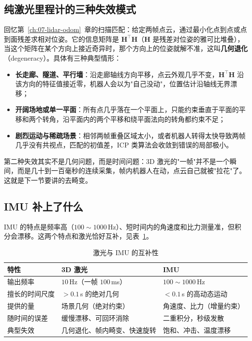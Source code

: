 \subsection{纯激光里程计的三种失效模式}

回忆第~\ref{ch:07-lidar-odom}~章的扫描匹配：给定两帧点云，通过最小化点到点或点到面残差求相对位姿。它的信息矩阵是 $\bm{H}^{\top}\bm{H}$（$\bm{H}$ 是残差对位姿的雅可比堆叠），当这个矩阵在某个方向上接近奇异时，那个方向上的位姿就解不准，这叫\textbf{几何退化}（degeneracy）。具体有三种典型情形：

\begin{itemize}
  \item \textbf{长走廊、隧道、平行墙}：沿走廊轴线方向平移，点云外观几乎不变，$\bm{H}^{\top}\bm{H}$ 沿该方向的特征值接近零，机器人会以为"自己没动"，位置估计沿轴线无界漂移；
  \item \textbf{开阔场地或单一平面}：所有点几乎落在一个平面上，只能约束垂直于平面的平移和两个转角，沿平面内的两个平移和绕平面法向的转角都约束不足；
  \item \textbf{剧烈运动与稀疏场景}：相邻两帧重叠区域太小，或者机器人转得太快导致两帧几乎没有共视点，匹配的初值差，ICP 类算法会收敛到错误的局部极小。
\end{itemize}

第二种失效其实不是几何问题，而是时间问题：3D 激光的"一帧"并不是一个瞬间，而是几十到一百毫秒的连续采集，帧内机器人在动，点云自己就被"拉花"了。这就是下一节要讲的去畸变。

\subsection{IMU 补上了什么}

IMU 的特点是频率高（$100\sim1000$\,Hz）、短时间内的角速度和比力测量准，但积分会漂移。这两个特点和激光恰好互补，见表~\ref{tab:16-complement}。

\begin{table}[htbp]
  \centering
  \caption{激光与 IMU 的互补性}\label{tab:16-complement}
  \small
  \begin{tabular}{lll}
    \toprule
    特性 & 3D 激光 & IMU \\
    \midrule
    输出频率 & $10$\,Hz（一帧 $100$\,ms） & $100\sim1000$\,Hz \\
    擅长的时间尺度 & $>0.1$\,s 的绝对几何 & $<0.1$\,s 的高动态运动 \\
    提供的量 & 场景几何（绝对约束） & 角速度、比力（增量约束） \\
    随时间的误差 & 缓慢漂移、可回环消除 & 二重积分，秒级发散 \\
    典型失效 & 几何退化、帧内畸变、快速旋转 & 饱和、冲击、温度漂移 \\
    \bottomrule
  \end{tabular}
\end{table}

